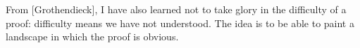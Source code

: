 \documentclass[preview]{standalone}
\begin{document}
\begin{center}
From [Grothendieck], I have also learned not to take glory in the  difficulty of a proof: difficulty means we have not understood. The idea is to be able to  paint a landscape in which the proof is obvious.
\end{center}
\end{document}
